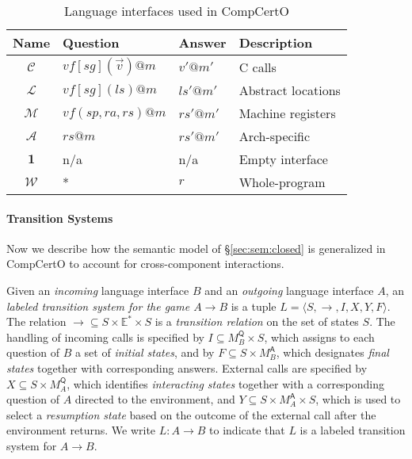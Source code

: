 \documentclass[sigplan,10pt,review,anonymous]{acmart}
\newcommand{\kw}[1]{\ensuremath{ \mathsf{#1} }}
\begin{document}

\begin{table} %
  \begin{tabular}{clll}
    \hline
    Name & Question & Answer & Description \\
    \hline
    $\mathcal{C}$ &
      $\mathit{vf}[\mathit{sg}](\vec{v})@m$ & $v'@m'$ &
      C calls \\
    $\mathcal{L}$ &
      $\mathit{vf}[\mathit{sg}](\mathit{ls})@m$ & $\mathit{ls}'@m'$ &
      Abstract locations \\
    $\mathcal{M}$ &
      $\mathit{vf}(\mathit{sp},\mathit{ra},\mathit{rs})@m$ & $\mathit{rs}'@m'$ &
      Machine registers \\
    $\mathcal{A}$ &
      $\mathit{rs}@m$ & $\mathit{rs}'@m'$ &
      Arch-specific \\
    $\mathbf{1}$ & n/a & n/a &
      Empty interface \\
    $\mathcal{W}$ & * & $r$ &
      Whole-program \\
    \hline
  \end{tabular}
  \caption{Language interfaces used in CompCertO}
  \label{tbl:li}
\end{table}

\paragraph{Transition Systems} %

Now we describe how the semantic model of
\S\ref{sec:sem:closed}
is generalized in CompCertO
to account for cross-component interactions.

\begin{definition}
Given an \emph{incoming} language interface $B$
and an \emph{outgoing} language interface $A$,
an \emph{labeled transition system for the game $A \rightarrow B$}
is a tuple $L = \langle S, \rightarrow, I, X, Y, F \rangle$.
The relation
${\rightarrow} \subseteq S \times \mathbb{E}^* \times S$ is
a \emph{transition relation} on the set of states $S$.
The handling of incoming calls is specified by
$I \subseteq M_B^\kw{Q} \times S$, which
assigns to each question of $B$ a set of \emph{initial states}, and by
$F \subseteq S \times M_B^\kw{A}$,
which designates \emph{final states} together with corresponding answers.
External calls are specified by
$X \subseteq S \times M_A^\kw{Q}$,
which identifies \emph{interacting states} together with
a corresponding question of $A$ directed to the environment, and
$Y \subseteq S \times M_A^\kw{A} \times S$,
which is used to select a \emph{resumption state}
based on the outcome of the external call
after the environment returns.
We write $L : A \rightarrow B$ to indicate that
$L$ is a labeled transition system for $A \rightarrow B$.
\end{definition}
\end{document}
